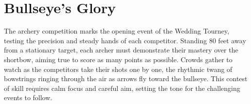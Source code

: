 \section*{Bullseye's Glory}
{\entryfont The archery competition marks the opening event of the Wedding Tourney, testing the precision and steady hands of each competitor. Standing 80 feet away from a stationary target, each archer must demonstrate their mastery over the shortbow, aiming true to score as many points as possible. Crowds gather to watch as the competitors take their shots one by one, the rhythmic twang of bowstrings ringing through the air as arrows fly toward the bullseye. This contest of skill requires calm focus and careful aim, setting the tone for the challenging events to follow.}

